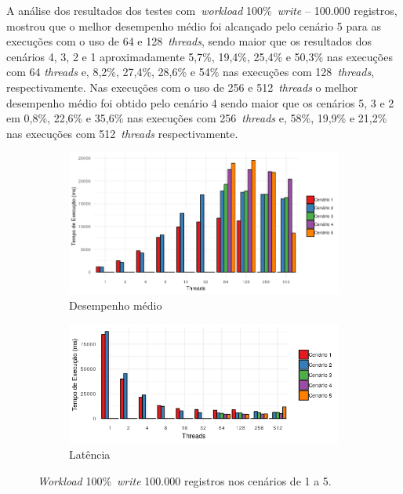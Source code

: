 \documentclass[12pt]{article}
\begin{document}
A análise dos resultados dos testes com~\emph{workload} 100\%~\emph{write} -- 100.000 registros, mostrou que o melhor desempenho médio foi alcançado pelo cenário 5 para as execuções com o uso de 64 e 128~\emph{threads}, sendo maior que os resultados dos cenários 4, 3, 2 e 1 aproximadamente 5,7\%, 19,4\%, 25,4\% e 50,3\% nas execuções com 64 \emph{threads} e, 8,2\%, 27,4\%, 28,6\% e 54\% nas execuções com 128~\emph{threads}, respectivamente. 
Nas execuções com o uso de 256 e 512~\emph{threads} o melhor desempenho médio foi obtido pelo cenário 4 sendo maior que os cenários 5, 3 e 2 em 0,8\%, 22,6\% e 35,6\% nas execuções com 256~\emph{threads} e, 58\%, 19,9\% e 21,2\% nas execuções com 512~\emph{threads} respectivamente.

\begin{figure}
    \centering
    \begin{subfigure}[b]{0.49\textwidth}
        \centering
        \includegraphics[width=\textwidth]{images/figura11}
        \caption{Desempenho médio}
        \label{figura11}
    \end{subfigure}
        \hfill
    \begin{subfigure}[b]{0.49\textwidth}  
        \centering 
        \includegraphics[width=\textwidth]{images/figura12}
        \caption{Latência}%
        \label{figura12}
    \end{subfigure}
    \caption{\emph{Workload} 100\%~\emph{write} 100.000 registros nos cenários de 1 a 5.}
\end{figure}
\end{document}
